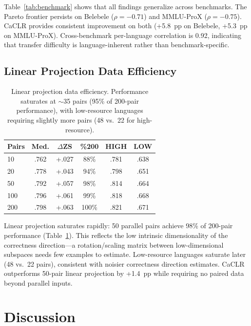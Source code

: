 \documentclass[11pt,a4paper]{article}
\begin{document}
Table~\ref{tab:benchmark} shows that all findings generalize across benchmarks.
The Pareto frontier persists on Belebele ($\rho = -0.71$) and MMLU-ProX ($\rho = -0.75$).
CaCLR provides consistent improvement on both (+5.8~pp on Belebele, +5.3~pp on MMLU-ProX).
Cross-benchmark per-language correlation is 0.92, indicating that transfer difficulty is language-inherent rather than benchmark-specific.

\subsection{Linear Projection Data Efficiency}
\label{sec:exp:linproj}

\begin{table}[t]
\centering
\small
\begin{tabular}{@{}lccccc@{}}
\toprule
\textbf{Pairs} & \textbf{Med.} & $\Delta$\textbf{ZS} & \textbf{\%200} & \textbf{HIGH} & \textbf{LOW} \\
\midrule
10  & .762 & +.027 & 88\% & .781 & .638 \\
20  & .778 & +.043 & 94\% & .798 & .651 \\
50  & .792 & +.057 & 98\% & .814 & .664 \\
100 & .796 & +.061 & 99\% & .818 & .668 \\
200 & .798 & +.063 & 100\% & .821 & .671 \\
\bottomrule
\end{tabular}
\caption{Linear projection data efficiency. Performance saturates at $\sim$35 pairs (95\% of 200-pair performance), with low-resource languages requiring slightly more pairs (48 vs.\ 22 for high-resource).}
\label{tab:linproj}
\end{table}

Linear projection saturates rapidly: 50 parallel pairs achieve 98\% of 200-pair performance (Table~\ref{tab:linproj}).
This reflects the low intrinsic dimensionality of the correctness direction---a rotation/scaling matrix between low-dimensional subspaces needs few examples to estimate.
Low-resource languages saturate later (48 vs.\ 22 pairs), consistent with noisier correctness direction estimates.
CaCLR outperforms 50-pair linear projection by +1.4~pp while requiring no paired data beyond parallel inputs.


\section{Discussion}
\label{sec:discussion}
\end{document}
